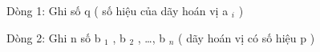 Dòng 1: Ghi số q ( số hiệu của dãy hoán vị a   $_    i   $   )  

   Dòng 2: Ghi n số b   $_    1   $   , b   $_    2   $   , …, b   $_    n   $   ( dãy hoán vị có số hiệu p )